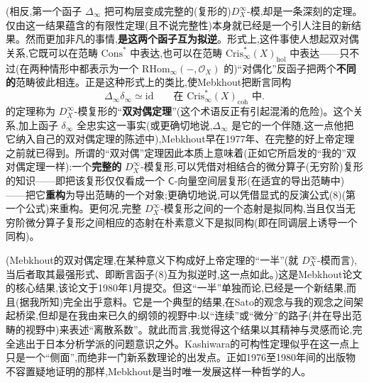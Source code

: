 \dmark{}(相反,第一个函子 $\Delta_{\infty}$ 把可构层变成完整的(复形的)$D^{\infty}_{X}$-模,却是一条深刻的定理。仅由这一结果蕴含的有限性定理(且不说完整性)本身就已经是一个引人注目的新结果。然而更加非凡的事情,\textbf{是这两个函子互为拟逆}。形式上,这件事使人想起双对偶关系,它既可以在范畴 $\mathrm{Cons}^{*}$ 中表达,也可以在范畴 $\mathrm{Cris}^{*}_{\infty}(X)_{\mathrm{hol}}$ 中表达——只不过(在两种情形中都表示为一个 $\mathrm{RHom}_{\infty}(-,\mathcal{O}_{X})$ 的)“对偶化”反函子把两个\textbf{不同的}范畴彼此相连。正是这种形式上的类比,使Mebkhout把断言同构
\begin{equation*}
\Delta_{\infty}\delta_{\infty}\simeq \mathrm{id}\qquad \text{在 }\mathrm{Cris}^{*}_{\infty}(X)_{\mathrm{coh}}\text{ 中}.
\tag{9}
\end{equation*}
的定理称为 $D^{\infty}_{X}$-模复形的“\textbf{双对偶定理}”(这个术语反正有引起混淆的危险)。这个关系,加上函子 $\delta_{\infty}$ 全忠实这一事实(或更确切地说,$\Delta_{\infty}$ 是它的一个伴随,这一点他把它纳入自己的双对偶定理的陈述中),Mebkhout早在1977年、在完整的好上帝定理之前就已得到。所谓的“双对偶”定理因此本质上意味着(正如它所启发的“我的”双对偶定理一样):一个\textbf{完整的} $D^{\infty}_{X}$-模复形,可以凭借对相结合的微分算子(无穷阶)复形的知识——即把该复形仅仅看成一个 $\mathsf{C}$-向量空间层复形(在适宜的导出范畴中)——把它\textbf{重构}为导出范畴的一个对象;更确切地说,可以凭借显式的反演公式(8)(第一个公式)来重构。更何况,完整 $D^{\infty}_{X}$-模复形之间的一个态射是拟同构,当且仅当无穷阶微分算子复形之间相应的态射在朴素意义下是拟同构(即在同调层上诱导一个同构)。

\dmark{}(Mebkhout的双对偶定理,在某种意义下构成好上帝定理的“一半”(就 $D^{\infty}_{X}$-模而言),当后者取其最强形式、即断言函子(8)互为拟逆时,这一点如此。)这是Mebkhout论文的核心结果,该论文于1980年1月提交。但这“一半”单独而论,已经是一个新结果,而且(据我所知)完全出乎意料。它是一个典型的结果,在Sato的观念与我的观念之间架起桥梁,但却是在我由来已久的纲领的视野中:以“连续”或“微分”的路子(并在导出范畴的视野中)来表述“离散系数”。就此而言,我觉得这个结果以其精神与灵感而论,完全逃出于日本分析学派的问题意识之外。Kashiwara的可构性定理似乎在这一点上只是一个“侧面”,而绝非一门新系数理论的出发点。正如1976至1980年间的出版物不容置疑地证明的那样,Mebkhout是当时唯一发展这样一种哲学的人。

